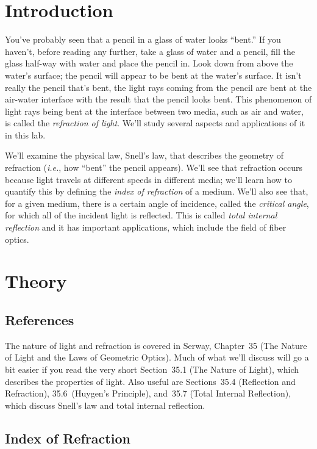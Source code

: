 \section{Introduction}

You've probably seen that a pencil in a glass of water looks ``bent.'' If you 
haven't, before reading any further, take a glass of water and a pencil, fill 
the glass half-way with water and place the pencil in.  Look down from above 
the water's surface; the pencil will appear to be bent at the water's surface.
It isn't really the pencil that's bent, the light rays coming from the pencil
are bent at the air-water interface with the result that the pencil looks bent.
This phenomenon of light rays being bent at the interface between two media, 
such as air and water, is called the {\it refraction of light}.  We'll study 
several aspects and applications of it in this lab.  

We'll examine the physical law, Snell's law, that describes the geometry of 
refraction ({\it i.e.}, how ``bent'' the pencil appears). We'll see that 
refraction occurs because light travels at different speeds in different 
media; we'll learn how to quantify this by defining the {\it index of 
refraction} of a medium.  We'll also see that, for a given medium, there is a 
certain angle of incidence, called the {\it critical angle}, for which all of 
the incident light is reflected.  This is called {\it total internal 
reflection} and it has important applications, which include the field of 
fiber optics. 

\section{Theory}

\subsection{References}

The nature of light and refraction is covered in Serway, Chapter~35 (The 
Nature of Light and the Laws of Geometric Optics).  Much of what we'll
discuss will go a bit easier if you read the very short Section~35.1 (The 
Nature of Light), which describes the properties of light. Also 
useful are Sections~35.4 (Reflection and Refraction),   
35.6~(Huygen's Principle), and~35.7 (Total Internal Reflection), 
which discuss Snell's law and total internal reflection.  


\subsection{Index of Refraction}

